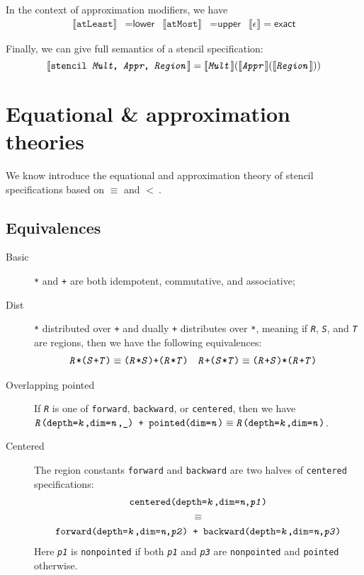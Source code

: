 \documentclass{article}
\theoremstyle{definition}
\theoremstyle{plain}
\newcommand{\interp}[1]{\llbracket\texttt{#1}\rrbracket}
\newcommand{\textcap}[1]{\texttt{\textit{#1}}}
\begin{document}
In the context of approximation modifiers, we have
%
\begin{align*}
  \interp{atLeast} & = \textsf{lower} &
  \interp{atMost} & = \textsf{upper} &
  \llbracket \epsilon \rrbracket = \textsf{exact}
\end{align*}

Finally, we can give full semantics of a stencil specification:
%
\begin{equation*}
  \interp{stencil \textit{Mult}, \textit{Appr}, \textit{Region}} =
    \interp{\textit{Mult}}{(\interp{\textit{Appr}}(\interp{\textit{Region}}))}
\end{equation*}

\section{Equational \& approximation theories}

We know introduce the equational and approximation theory of stencil
specifications based on $\equiv$ and $<\:$.

\subsection{Equivalences}

\begin{description}
  \item[Basic] \texttt{*} and \texttt{+} are both idempotent, commutative, and
    associative;
%
  \item[Dist] \texttt{*} distributed over \texttt{+} and dually
    \texttt{+} distributes over \texttt{*}, meaning if \textcap{R}, \textcap{S},
    and \textcap{T} are regions, then we have the following equivalences:
%
    \begin{align*}
      \texttt{\textcap{R}*(\textcap{S}+\textcap{T})} & \equiv
        \texttt{(\textcap{R}*\textcap{S})+(\textcap{R}*\textcap{T})} &
      \texttt{\textcap{R}+(\textcap{S}*\textcap{T})} & \equiv
        \texttt{(\textcap{R}+\textcap{S})*(\textcap{R}+\textcap{T})}
    \end{align*}
%
  \item[Overlapping pointed] If \textcap{R} is one of \texttt{forward},
    \texttt{backward}, or \texttt{centered}, then we have
    $\texttt{\textcap{R}(depth=\textcap{k},dim=\textcap{n},\_) +
    pointed(dim=\textcap{n})} \equiv
    \texttt{\textcap{R}(depth=\textcap{k},dim=\textcap{n})}$.
%
  \item[Centered] The region constants \texttt{forward} and \texttt{backward}
    are two halves of \texttt{centered} specifications:
%
    \begin{gather*}
      \texttt{centered(depth=\textcap{k},dim=\textit{n},\textcap{p1})} \\
      \equiv \\
      \texttt{forward(depth=\textcap{k},dim=\textit{n},\textcap{p2}) +
        backward(depth=\textcap{k},dim=\textit{n},\textcap{p3})}
    \end{gather*}
%
    Here \textcap{p1} is \texttt{nonpointed} if both \textcap{p1} and
    \textcap{p3} are \texttt{nonpointed} and \texttt{pointed} otherwise.
\end{description}
\end{document}

